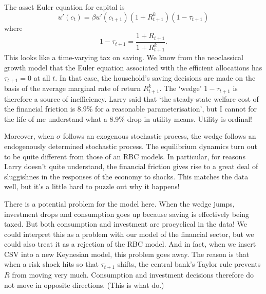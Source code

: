 \documentclass[11pt,letterpaper,reqno,oneside]{article}
\begin{document}
The asset Euler equation for capital is
%
\begin{equation*}
	u'(c_t) = \beta u'(c_{t+1}) \left(1+R^k_{t+1}\right) (1-\tau_{t+1})
\end{equation*}
%
where
%
\begin{equation*}
	1 - \tau_{t+1} = \frac{ 1+R_{t+1} }{ 1+R^k_{t+1} } .
\end{equation*}
%
This looks like a time-varying tax on saving. We know from the neoclassical growth model that the Euler equation associated with the efficient allocations has $\tau_{t+1}=0$ at all $t$. In that case, the household's saving decisions are made on the basis of the average marginal rate of return $R^k_{t+1}$. The `wedge' $1-\tau_{t+1}$ is therefore a source of inefficiency. Larry said that `the steady-state welfare cost of the financial friction is 8.9\% for a reasonable parameterisation', but I cannot for the life of me understand what a 8.9\% drop in utility means. Utility is ordinal!


Moreover, when $\sigma$ follows an exogenous stochastic process, the wedge follows an endogenously determined stochastic process. The equilibrium dynamics turn out to be quite different from those of an RBC models. In particular, for reasons Larry doesn't quite understand, the financial friction gives rise to a great deal of sluggishnes in the responses of the economy to shocks. This matches the data well, but it's a little hard to puzzle out why it happens!

There is a potential problem for the model here. When the wedge jumps, investment drops and consumption goes up because saving is effectively being taxed. But both consumption and investment are procyclical in the data! We could interpret this as a problem with our model of the financial sector, but we could also treat it as a rejection of the RBC model. And in fact, when we insert CSV into a new Keynesian model, this problem goes away. The reason is that when a risk shock hits so that $\tau_{t+1}$ shifts, the central bank's Taylor rule prevents $R$ from moving very much. Consumption and investment decisions therefore do not move in opposite directions. (This is what \textcite{ChristianoMottoRostagno2014} do.)







\end{document}
